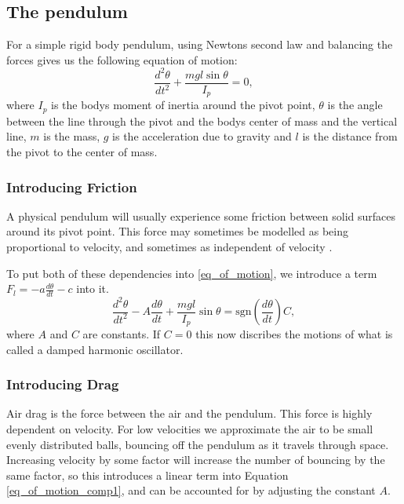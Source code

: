 \documentclass[11pt, a4paper]{article}
\begin{document}
\subsection{The pendulum}
For a simple rigid body pendulum, using Newtons second law and balancing the
forces gives us the following
equation of motion:
\begin{equation}
  \frac{d^2\theta}{dt^2} + \frac{mgl\sin{\theta}}{I_p} = 0,
  \label{eq_of_motion}
\end{equation}
where $I_p$ is the bodys moment of inertia around the pivot point, $\theta$ is the
angle between the line through the pivot and the bodys center of mass and the
vertical line, $m$ is the mass, $g$ is the acceleration due to gravity and
$l$ is the distance from the pivot to the center of mass.



\subsubsection{Introducing Friction}
A physical pendulum will usually experience some friction between solid
surfaces around its pivot point.
This force may sometimes be modelled as being proportional to velocity\cite[p. 30]{book},
and sometimes as independent of velocity \cite{friction}.

To put both of these dependencies into \ref{eq_of_motion}, 
we introduce a term $F_l = -a \frac{d\theta}{dt} - c$ into it. 
\begin{equation}
    \frac{d^2\theta}{dt^2} 
  - A \frac{d\theta}{dt}
  + \frac{mgl}{I_p}\sin{\theta} = \text{sgn}(\frac{d\theta}{dt})C,
  \label{eq_of_motion_comp1}
\end{equation}
where $A$ and $C$ are constants.
If $C = 0$ this now discribes the motions of what is 
called a damped harmonic oscillator\cite{osc}.

\subsubsection{Introducing Drag}
Air drag is the force between the air and the pendulum. 
This force is highly dependent on velocity.
For low velocities we approximate the air to be small evenly distributed balls, bouncing off the
pendulum as it travels through space. 
Increasing velocity by some factor will increase the number of bouncing by the same
factor, so this introduces a linear term into 
Equation \ref{eq_of_motion_comp1}, and can be accounted for by adjusting the constant
$A$.
\end{document}

